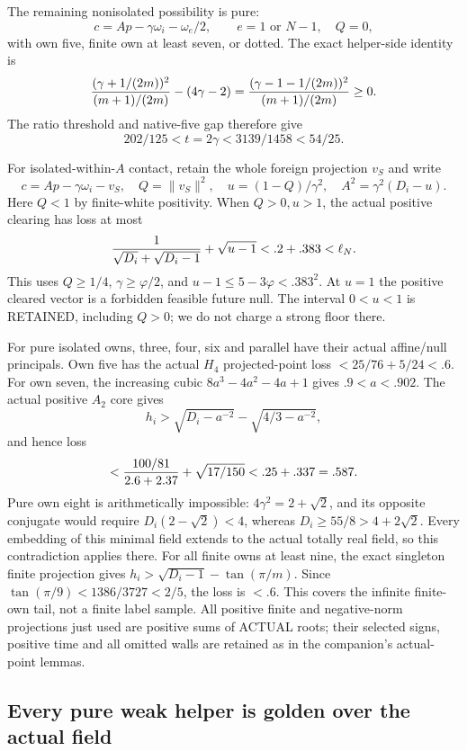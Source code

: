 The remaining nonisolated possibility is pure:
\[
 c=Ap-\gamma\omega_i-\omega_e/2,\qquad
 e=1\text{ or }N-1,\quad Q=0,
\]
with own five, finite own at least seven, or dotted.
The exact helper-side identity is
\[
 {(\gamma+1/(2m))^2\over(m+1)/(2m)}-(4\gamma-2)
 ={(\gamma-1-1/(2m))^2\over(m+1)/(2m)}\ge0.
\]
The ratio threshold and native-five gap therefore give
\[
             202/125<t=2\gamma<3139/1458<54/25.
\tag{Astrip}\label{eq:arithAhelperphysical}
\]

For isolated-within-\(A\) contact, retain the whole foreign
projection \(v_S\) and write
\[
 c=Ap-\gamma\omega_i-v_S,\quad Q=\|v_S\|^2,\quad
 u=(1-Q)/\gamma^2,\quad A^2=\gamma^2(D_i-u).
\]
Here \(Q<1\) by finite-white positivity.
When \(Q>0,u>1\), the actual positive clearing has loss at most
\[
 {1\over\sqrt{D_i}+\sqrt{D_i-1}}+\sqrt{u-1}
 <.2+.383<\ell_N .
\]
This uses \(Q\ge1/4\), \(\gamma\ge\varphi/2\), and
\(u-1\le5-3\varphi<.383^2\).
At \(u=1\) the positive cleared vector is a forbidden feasible
future null.
The interval \(0<u<1\) is RETAINED, including \(Q>0\);
we do not charge a strong floor there.

For pure isolated owns, three, four, six and parallel have their
actual affine/null principals.
Own five has the actual \(H_4\) projected-point loss
\(<25/76+5/24<.6\).
For own seven, the increasing cubic
\(8a^3-4a^2-4a+1\) gives \(.9<a<.902\).
The actual positive \(A_2\) core gives
\[
 h_i>\sqrt{D_i-a^{-2}}-\sqrt{4/3-a^{-2}},
\]
and hence loss
\[
 <{100/81\over2.6+2.37}+\sqrt{17/150}
 <.25+.337=.587 .
\]
Pure own eight is arithmetically impossible:
\(4\gamma^2=2+\sqrt2\), and its opposite conjugate would require
\(D_i(2-\sqrt2)<4\), whereas
\(D_i\ge55/8>4+2\sqrt2\).
Every embedding of this minimal field extends to the actual
totally real field, so this contradiction applies there.
For all finite owns at least nine, the exact singleton finite
projection gives
\(h_i>\sqrt{D_i-1}-\tan(\pi/m)\).
Since \(\tan(\pi/9)<1386/3727<2/5\), the loss is \(<.6\).
This covers the infinite finite-own tail, not a finite label sample.
All positive finite and negative-norm projections just used are
positive sums of ACTUAL roots; their selected signs, positive
time and all omitted walls are retained as in the companion's
actual-point lemmas.

\subsection{Every pure weak helper is golden over the actual field}
\label{app:arithgoldenfield}

